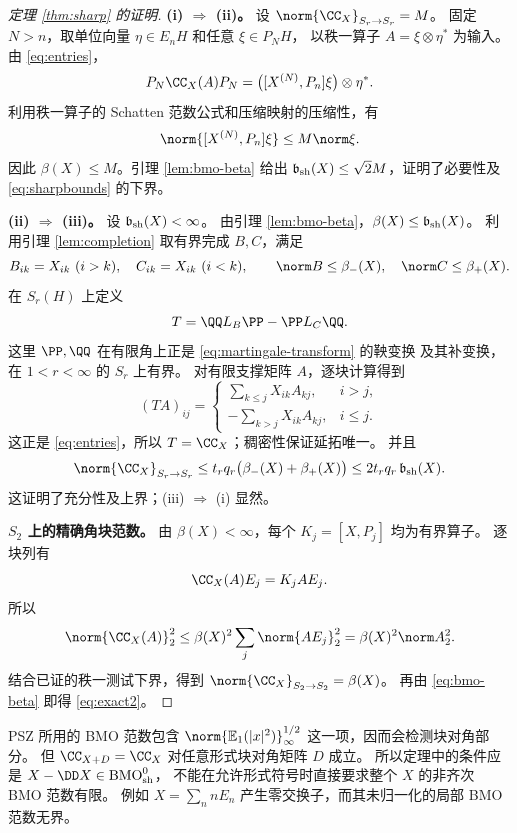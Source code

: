 \begin{proof}[定理 \ref{thm:sharp} 的证明]
\textbf{\textup{(i)} $\Rightarrow$ \textup{(ii)}。}
设 $\norm{\CC_X}_{S_r\to S_r}=M$。
固定 $N>n$，取单位向量 $\eta\in E_nH$ 和任意 $\xi\in P_NH$，
以秩一算子 $A=\xi\otimes\eta^*$ 为输入。由 \eqref{eq:entries}，
\[
 P_N\CC_X(A)P_N
 =\bigl([X^{(N)},P_n]\xi\bigr)\otimes\eta^*.
\]
利用秩一算子的 Schatten 范数公式和压缩映射的压缩性，有
\[
 \norm{[X^{(N)},P_n]\xi}\leq M\norm\xi.
\]
因此 $\beta(X)\leq M$。引理 \ref{lem:bmo-beta} 给出
$\mathfrak b_{\rm sh}(X)\leq\sqrt2 M$，证明了必要性及
\eqref{eq:sharpbounds} 的下界。

\medskip
\textbf{\textup{(ii)} $\Rightarrow$ \textup{(iii)}。}
设 $\mathfrak b_{\rm sh}(X)<\infty$。
由引理 \ref{lem:bmo-beta}，$\beta(X)\leq\mathfrak b_{\rm sh}(X)$。
利用引理 \ref{lem:completion} 取有界完成 $B,C$，满足
\[
 B_{ik}=X_{ik}\ (i>k),\quad C_{ik}=X_{ik}\ (i<k),\qquad
 \norm B\leq\beta_-(X),\quad\norm C\leq\beta_+(X).
\]
在 $S_r(H)$ 上定义
\begin{equation}\label{eq:factorization}
 T=\QQ L_B\PP-\PP L_C\QQ.
\end{equation}
这里 $\PP,\QQ$ 在有限角上正是 \eqref{eq:martingale-transform} 的鞅变换
及其补变换，在 $1<r<\infty$ 的 $S_r$ 上有界。
对有限支撑矩阵 $A$，逐块计算得到
\[
 (TA)_{ij}=\begin{cases}
   \displaystyle\sum_{k\leq j}X_{ik}A_{kj},&i>j,\\[4pt]
   \displaystyle-\sum_{k>j}X_{ik}A_{kj},&i\leq j.
 \end{cases}
\]
这正是 \eqref{eq:entries}，所以 $T=\CC_X$；稠密性保证延拓唯一。
并且
\[
 \norm{\CC_X}_{S_r\to S_r}
 \leq t_rq_r\bigl(\beta_-(X)+\beta_+(X)\bigr)
 \leq2t_rq_r\,\mathfrak b_{\rm sh}(X).
\]
这证明了充分性及上界；\textup{(iii)} $\Rightarrow$ \textup{(i)} 显然。

\medskip
\textbf{$S_2$ 上的精确角块范数。}
由 $\beta(X)<\infty$，每个 $K_j=[X,P_j]$ 均为有界算子。
逐块列有
\[
 \CC_X(A)E_j=K_jAE_j.
\]
所以
\[
 \norm{\CC_X(A)}_2^2
 \leq\beta(X)^2\sum_j\norm{AE_j}_2^2
 =\beta(X)^2\norm A_2^2.
\]
结合已证的秩一测试下界，得到
$\norm{\CC_X}_{S_2\to S_2}=\beta(X)$。
再由 \eqref{eq:bmo-beta} 即得 \eqref{eq:exact2}。
\end{proof}

\begin{remark}[为何必须减去首项]
PSZ 所用的 BMO 范数包含
$\norm{\mathbb E_1(|x|^2)}_\infty^{1/2}$ 这一项，因而会检测块对角部分。
但 $\CC_{X+D}=\CC_X$ 对任意形式块对角矩阵 $D$ 成立。
所以定理中的条件应是 $X-\DD X\in\mathrm{BMO}_{\rm sh}^{0}$，
不能在允许形式符号时直接要求整个 $X$ 的非齐次 BMO 范数有限。
例如 $X=\sum_n nE_n$ 产生零交换子，而其未归一化的局部 BMO 范数无界。
\end{remark}

